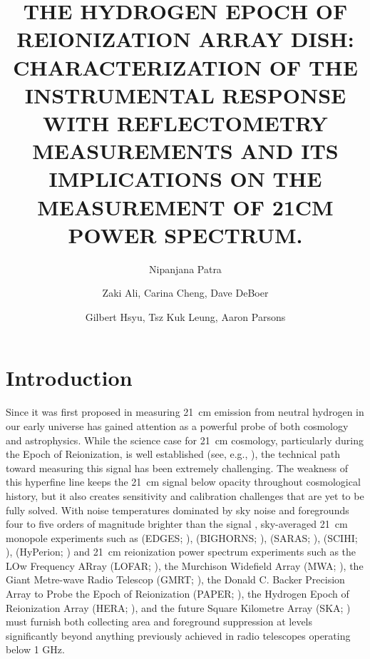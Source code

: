 \documentclass[iop]{emulateapj}
\begin{document}
\title{THE HYDROGEN EPOCH OF REIONIZATION ARRAY DISH: CHARACTERIZATION OF  THE INSTRUMENTAL RESPONSE WITH REFLECTOMETRY MEASUREMENTS AND ITS IMPLICATIONS ON THE MEASUREMENT OF 21CM POWER SPECTRUM. } 

\author{Nipanjana Patra }
\author{Zaki Ali, Carina Cheng, Dave DeBoer}
\author{Gilbert Hsyu, Tsz Kuk Leung, Aaron Parsons}

\begin{abstract}
\end{abstract}


\section{Introduction}

Since it was first proposed in \citep{Shaver_et_al1999} measuring 21~cm
emission from neutral hydrogen in our early universe has gained attention as a
powerful probe of both cosmology and astrophysics.  While the science case for
21~cm cosmology, particularly during the Epoch of Reionization, is well
established (see, e.g.,
\citep{furlanetto_et_al2006,morales_wyithe2010,pritchard_loeb2012}),
the technical path toward measuring this signal has been extremely challenging.  The
weakness of this hyperfine line keeps the 21~cm signal below opacity throughout
cosmological history, but it also creates sensitivity and calibration
challenges that are yet to be fully solved.  With noise temperatures dominated
by sky noise \citep{XXX} and foregrounds four to five orders of magnitude
brighter than the signal \citep{XXX}, 
sky-averaged 21~cm monopole experiments such as
(EDGES; \citealt{XXX}),
(BIGHORNS; \citealt{XXX}),
(SARAS; \citealt{patra_et_al2014}),
(SCIHI; \citealt{voytek_et_al2014}),
(HyPerion; \citealt{presley_et_al2015})
and 21~cm reionization power spectrum experiments such as
the LOw Frequency ARray (LOFAR; \citealt{XXX}),
the Murchison Widefield Array (MWA; \citealt{XXX}),
the Giant Metre-wave Radio Telescop (GMRT; \citealt{XXX}),
the Donald C. Backer Precision Array to Probe the Epoch of Reionization (PAPER; \citealt{parsons_et_al2010}),
the Hydrogen Epoch of Reionization Array (HERA; \citealt{XXX}),
and the future Square Kilometre Array (SKA; \citealt{XXX})
must
furnish both collecting area and foreground suppression at levels significantly
beyond anything previously achieved in radio telescopes operating below 1 GHz.
\end{document}
